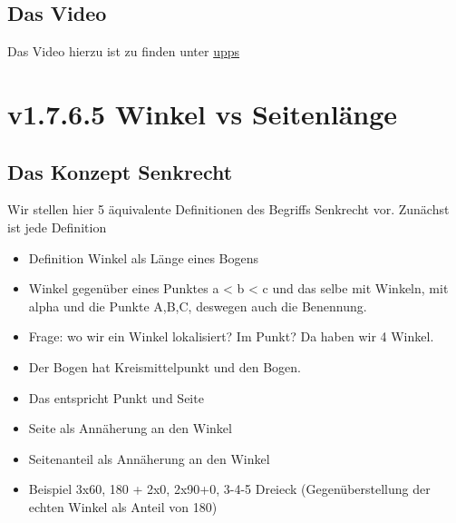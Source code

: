 \documentclass[a4paper]{amsart}
\theoremstyle{definition}
\begin{document}
\subsection*{Das Video}
Das Video hierzu ist zu finden unter 
{\tiny
   \url{upps}
}

\section{v1.7.6.5 Winkel vs Seitenlänge}

\subsection{Das Konzept Senkrecht}
Wir stellen hier 5 äquivalente Definitionen des Begriffs Senkrecht vor. Zunächst ist jede Definition 


\begin{itemize}
   \item Definition Winkel als Länge eines Bogens
   \item Winkel gegenüber eines Punktes a < b < c und das selbe mit Winkeln, mit alpha und die Punkte A,B,C, deswegen auch die Benennung.
   \item Frage: wo wir ein Winkel lokalisiert? Im Punkt? Da haben wir 4 Winkel.
   \item Der Bogen hat Kreismittelpunkt und den Bogen.
   \item Das entspricht Punkt und Seite
   \item Seite als Annäherung an den Winkel
   \item Seitenanteil als Annäherung an den Winkel
   \item Beispiel 3x60, 180 + 2x0, 2x90+0, 3-4-5 Dreieck (Gegenüberstellung der echten Winkel als Anteil von 180)
\end{itemize}
\end{document}
